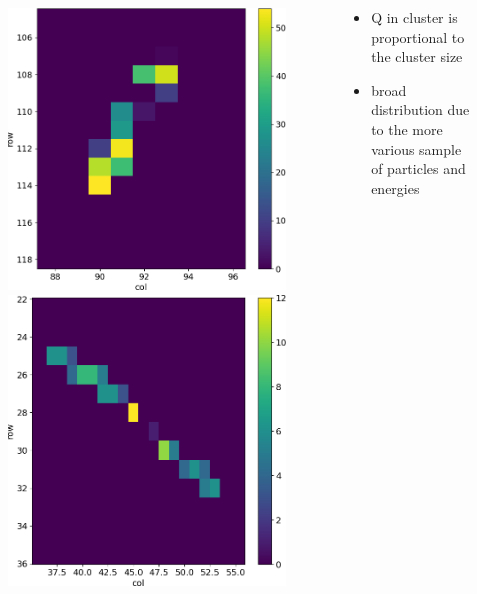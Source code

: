 \begin{frame}
\begin{columns}
\begin{figure}
                    \includegraphics[width=.3\linewidth]{figures/charaterization/evts/cosmic_rays/12.png} 
                    \includegraphics[width=.3\linewidth]{figures/charaterization/evts/cosmic_rays/19a.png}
                \end{figure}

                \begin{itemize}
                    \item Q in cluster is proportional to the cluster size
                    \item broad distribution due to the more various sample of particles and energies
                \end{itemize}
        \end{columns}
    \end{frame}    


